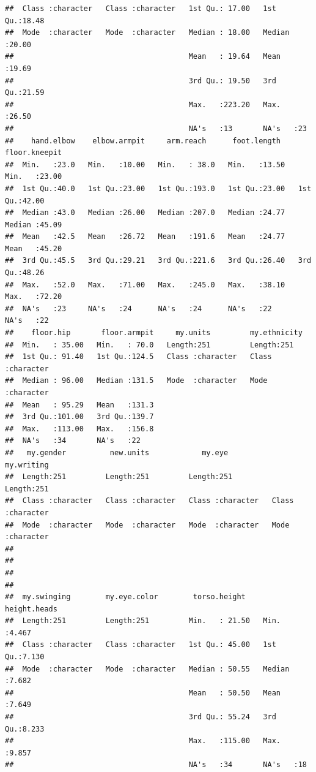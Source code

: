 \documentclass[]{article}
\begin{document}
\begin{verbatim}
##  Class :character   Class :character   1st Qu.: 17.00   1st Qu.:18.48  
##  Mode  :character   Mode  :character   Median : 18.00   Median :20.00  
##                                        Mean   : 19.64   Mean   :19.69  
##                                        3rd Qu.: 19.50   3rd Qu.:21.59  
##                                        Max.   :223.20   Max.   :26.50  
##                                        NA's   :13       NA's   :23     
##    hand.elbow    elbow.armpit     arm.reach      foot.length    floor.kneepit  
##  Min.   :23.0   Min.   :10.00   Min.   : 38.0   Min.   :13.50   Min.   :23.00  
##  1st Qu.:40.0   1st Qu.:23.00   1st Qu.:193.0   1st Qu.:23.00   1st Qu.:42.00  
##  Median :43.0   Median :26.00   Median :207.0   Median :24.77   Median :45.09  
##  Mean   :42.5   Mean   :26.72   Mean   :191.6   Mean   :24.77   Mean   :45.20  
##  3rd Qu.:45.5   3rd Qu.:29.21   3rd Qu.:221.6   3rd Qu.:26.40   3rd Qu.:48.26  
##  Max.   :52.0   Max.   :71.00   Max.   :245.0   Max.   :38.10   Max.   :72.20  
##  NA's   :23     NA's   :24      NA's   :24      NA's   :22      NA's   :22     
##    floor.hip       floor.armpit     my.units         my.ethnicity      
##  Min.   : 35.00   Min.   : 70.0   Length:251         Length:251        
##  1st Qu.: 91.40   1st Qu.:124.5   Class :character   Class :character  
##  Median : 96.00   Median :131.5   Mode  :character   Mode  :character  
##  Mean   : 95.29   Mean   :131.3                                        
##  3rd Qu.:101.00   3rd Qu.:139.7                                        
##  Max.   :113.00   Max.   :156.8                                        
##  NA's   :34       NA's   :22                                           
##   my.gender          new.units            my.eye           my.writing       
##  Length:251         Length:251         Length:251         Length:251        
##  Class :character   Class :character   Class :character   Class :character  
##  Mode  :character   Mode  :character   Mode  :character   Mode  :character  
##                                                                             
##                                                                             
##                                                                             
##                                                                             
##  my.swinging        my.eye.color        torso.height     height.heads  
##  Length:251         Length:251         Min.   : 21.50   Min.   :4.467  
##  Class :character   Class :character   1st Qu.: 45.00   1st Qu.:7.130  
##  Mode  :character   Mode  :character   Median : 50.55   Median :7.682  
##                                        Mean   : 50.50   Mean   :7.649  
##                                        3rd Qu.: 55.24   3rd Qu.:8.233  
##                                        Max.   :115.00   Max.   :9.857  
##                                        NA's   :34       NA's   :18
\end{verbatim}
\end{document}
